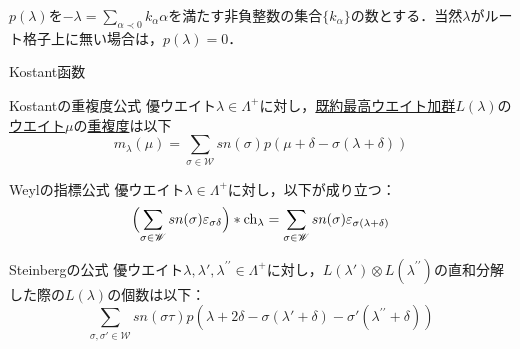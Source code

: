 \documentclass[rep_main]{subfiles}
\begin{document}
$p(\lambda)$を$-\lambda = \sum_{\alpha \prec 0} k_\alpha\alpha$を満たす非負整数の集合$\{k_\alpha\}$の数とする．当然$\lambda$がルート格子上に無い場合は，$p(\lambda) = 0$．




Kostant函数







\begin{mytheo}[label=thm:Kostant]{Kostantの重複度公式}
	優ウエイト$\lambda \in \Lambda^+$に対し，\hyperref[thm:hwmodule-exist]{既約最高ウエイト加群}$L(\lambda)$の\hyperref[def:weight-rep]{ウエイト}$\mu$の\hyperref[def:mutiplicity]{重複度}は以下
	\begin{equation}
		m_\lambda(\mu) = \sum_{\sigma \in \mathscr{W}} sn(\sigma)p(\mu + \delta - \sigma(\lambda + \delta))
	\end{equation}
\end{mytheo}




\begin{mytheo}[label=thm:Kostant]{Weylの指標公式}
	優ウエイト$\lambda \in \Lambda^+$に対し，以下が成り立つ：
	\begin{equation}
		\Bigl(\sum_{\sigma \in \mathscr{W}} sn(\sigma)\varepsilon_{\sigma\delta}\Bigr) * \operatorname{ch}_\lambda = \sum_{\sigma \in \mathscr{W}} sn(\sigma)\varepsilon_{\sigma(\lambda + \delta)}
	\end{equation}
\end{mytheo}



\begin{mytheo}[label=thm:Kostant]{Steinbergの公式}
	優ウエイト$\lambda, \lambda', \lambda^{\prime\prime} \in \Lambda^+$に対し，$L(\lambda') \otimes L(\lambda^{\prime\prime})$の直和分解した際の$L(\lambda)$の個数は以下：
	\begin{equation}
		\sum_{\sigma,\sigma' \in \mathscr{W}} sn(\sigma\tau)p(\lambda + 2\delta - \sigma(\lambda' + \delta) - \sigma'(\lambda^{\prime\prime} + \delta))
	\end{equation}
\end{mytheo}
\end{document}
